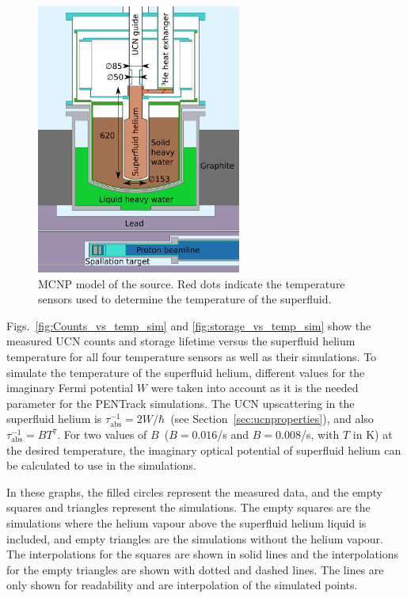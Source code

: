 \begin{figure}[h!]
  \centering
  \includegraphics[width=0.6\textwidth]{MCNPmodel.pdf}
  \caption[MCNP model of the UCN source]{MCNP model of the source. Red
    dots indicate the temperature sensors used to determine the
    temperature of the superfluid.}
  \label{fig:mcnpmodel}
\end{figure}


Figs.~\ref{fig:Counts_vs_temp_sim} and \ref{fig:storage_vs_temp_sim}
show the measured UCN counts and storage lifetime versus the
superfluid helium temperature for all four temperature sensors as well
as their simulations. To simulate the temperature of the superfluid
helium, different values for the imaginary Fermi potential $W$ were
taken into account as it is the needed parameter for the PENTrack
simulations. The UCN upscattering in the superfluid helium is
$\tau_{\mathrm{abs}}^{-1} = 2W/\hbar$~(see
Section~\ref{sec:ucnproperties}), and also
$\tau_{\mathrm{abs}}^{-1} = B T^7$. For two values of
$B$~($B = 0.016$/s and $B = 0.008$/s, with $T$ in K) at the desired
temperature, the imaginary optical potential of superfluid helium can
be calculated to use in the simulations.



In these graphs, the filled circles represent the measured data, and
the empty squares and triangles represent the simulations.  The empty
squares are the simulations where the helium vapour above the
superfluid helium liquid is included, and empty triangles are the
simulations without the helium vapour. The interpolations for the
squares are shown in solid lines and the interpolations for the empty
triangles are shown with dotted and dashed lines. The lines are only
shown for readability and are interpolation of the simulated points.



